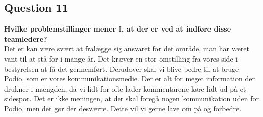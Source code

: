 \subsection{Question 11}
\noindent \textbf{Hvilke problemstillinger mener I, at der er ved at indføre disse teamledere?} \\
Det er kan være svært at fralægge sig ansvaret for det område, man har været vant til at stå for i mange år. Det kræver en stor omstilling fra vores side i bestyrelsen at få det gennemført. Derudover skal vi blive bedre til at bruge Podio, som er vores kommunikationsmedie. Der er alt for meget information der drukner i mængden, da vi lidt for ofte lader kommentarene køre lidt ud på et sidespor. Det er ikke meningen, at der skal foregå nogen kommunikation uden for Podio, men det gør der desværre. Dette vil vi gerne lave om på og forbedre.